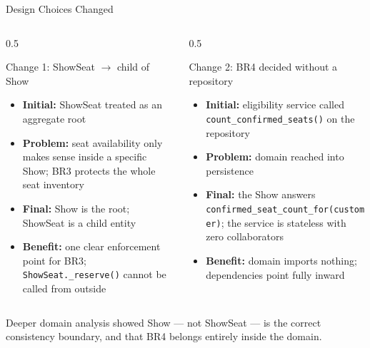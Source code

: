 \documentclass[aspectratio=169,11pt]{beamer}
\newcommand{\code}[1]{\texttt{#1}}
\begin{document}
\begin{frame}{Design Choices Changed}
  \begin{columns}[t]
    \begin{column}{0.5\textwidth}
      \begin{block}{Change 1: ShowSeat $\rightarrow$ child of Show}
        \scriptsize
        \begin{itemize}
          \item \textbf{Initial:} ShowSeat treated as an aggregate root
          \item \textbf{Problem:} seat availability only makes sense inside a
                specific Show; BR3 protects the whole seat inventory
          \item \textbf{Final:} Show is the root; ShowSeat is a child entity
          \item \textbf{Benefit:} one clear enforcement point for BR3;
                \code{ShowSeat.\_reserve()} cannot be called from outside
        \end{itemize}
      \end{block}
    \end{column}
    \begin{column}{0.5\textwidth}
      \begin{block}{Change 2: BR4 decided without a repository}
        \scriptsize
        \begin{itemize}
          \item \textbf{Initial:} eligibility service called
                \code{count\_confirmed\_seats()} on the repository
          \item \textbf{Problem:} domain reached into persistence
          \item \textbf{Final:} the Show answers
                \code{confirmed\_seat\_count\_for(customer)}; the service is
                stateless with zero collaborators
          \item \textbf{Benefit:} domain imports nothing; dependencies point
                fully inward
        \end{itemize}
      \end{block}
    \end{column}
  \end{columns}
  {\scriptsize Deeper domain analysis showed Show --- not ShowSeat --- is the
  correct consistency boundary, and that BR4 belongs entirely inside the domain.}
\end{frame}
\end{document}

